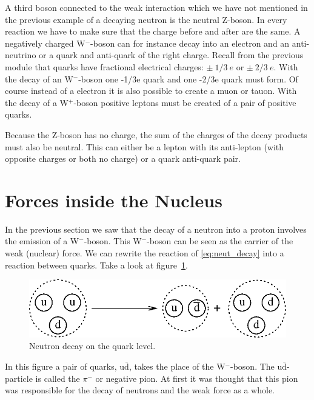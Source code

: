 \documentclass[12pt,a4paper]{article}
\numberwithin{equation}{section}
\numberwithin{figure}{section}
\numberwithin{table}{section}
\begin{document}
A third boson connected to the weak interaction which we have not mentioned in the previous example of a decaying neutron is the neutral Z-boson. In every reaction we have to make sure that the charge before and after are the same. A negatively charged W$^-$-boson can for instance decay into an electron and an anti-neutrino or a quark and anti-quark of the right charge. Recall from the previous module that quarks have fractional electrical charges: $\pm~1/3~e$ or $\pm~2/3~e$. With the decay of an W$^-$-boson one -1/3e quark and one -2/3e quark must form. Of course instead of a electron it is also possible to create a muon or tauon. With the decay of a W$^+$-boson positive leptons must be created of a pair of positive quarks.

Because the Z-boson has no charge, the sum of the charges of the decay products must also be neutral. This can either be a lepton with its anti-lepton (with opposite charges or both no charge) or a quark anti-quark pair.

\section{Forces inside the Nucleus}
In the previous section we saw that the decay of a neutron into a proton involves the emission of a W$^-$-boson. This W$^-$-boson can be seen as the carrier of the weak (nuclear) force. We can rewrite the reaction of \ref{eq:neut_decay} into a reaction between quarks. Take a look at figure~\ref{fig:neut_dacay_quark}.

\begin{figure}\begin{center}
\includegraphics[scale=1]{neut_dacay_quark.eps}%
\caption{Neutron decay on the quark level.}\label{fig:neut_dacay_quark}
\end{center}\end{figure}

In this figure a pair of quarks, u$\bar{\mbox{d}}$, takes the place of the W$^-$-boson. The u$\bar{\mbox{d}}$-particle is called the $\pi^-$ or negative pion. At first it was thought that this pion was responsible for the decay of neutrons and the weak force as a whole.
\end{document}
